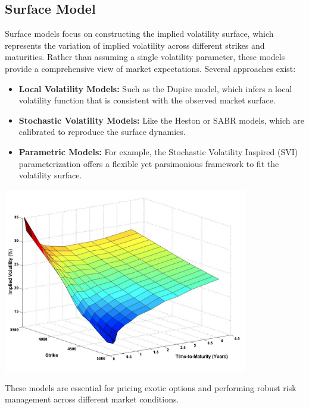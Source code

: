 \documentclass[letterpaper,11pt]{article}
\begin{document}
\subsection{Surface Model}
Surface models focus on constructing the implied volatility surface, which represents the variation of implied volatility across different strikes and maturities. Rather than assuming a single volatility parameter, these models provide a comprehensive view of market expectations. Several approaches exist:
\begin{itemize}
    \item \textbf{Local Volatility Models:} Such as the Dupire model, which infers a local volatility function that is consistent with the observed market surface.
    \item \textbf{Stochastic Volatility Models:} Like the Heston or SABR models, which are calibrated to reproduce the surface dynamics.
    \item \textbf{Parametric Models:} For example, the Stochastic Volatility Inspired (SVI) parameterization offers a flexible yet parsimonious framework to fit the volatility surface.
\end{itemize}
\begin{center}
    \includegraphics[width=0.8\textwidth]{img/vol_surface.png}
    \end{center}
These models are essential for pricing exotic options and performing robust risk management across different market conditions.
\end{document}
